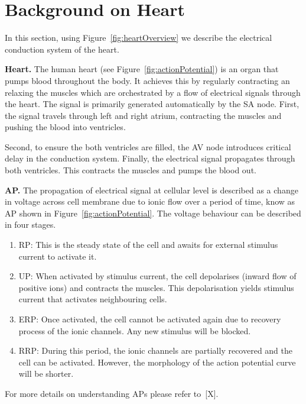 \section{Background on Heart }
\begin{figure*}[htbp]
	\centering
	
	\caption{Electrical conduction systems of a heart}
	\label{fig:heartOverview}
\end{figure*}

In this section, using Figure~\ref{fig:heartOverview} we 
describe the electrical conduction system of the heart.

\noindent \textbf{Heart.}
The human heart (see Figure~\ref{fig:actionPotential})
 is an organ that pumps blood throughout the body.
It achieves this by regularly contracting an relaxing the muscles
which are orchestrated by a flow of electrical signals through the heart.
The signal is primarily generated automatically by the \ac{SA} node.
First, the signal travels through left and right atrium, contracting 
the muscles and pushing the blood into ventricles.
 
Second, to ensure the both ventricles are filled, 
the \ac{AV} node introduces critical delay 
in the conduction system.   
Finally, the electrical signal propagates through 
both ventricles. This contracts the muscles and pumps the blood out.


	
\noindent \textbf{\acf{AP}.} 
The propagation of electrical signal at cellular level 
is described as a change in  voltage 
across cell membrane due to ionic flow over a period of time, 
know as \acf{AP} shown in Figure~\ref{fig:actionPotential}. 
The voltage behaviour can be described in four stages.
\begin{enumerate}
	\item \acf{RP}: This is the steady state of the cell and awaits for 
					external stimulus current to activate it.
	\item \acf{UP}: When activated by stimulus current, 
					the cell depolarises (inward flow of positive ions) and 
					contracts the muscles. This depolarisation yields 
					stimulus current that activates neighbouring cells.
	\item \acf{ERP}: Once activated, the cell cannot be activated again 
					 due to recovery process of the ionic channels. 
					 Any new stimulus will be blocked. 
	\item \acf{RRP}: During this period, the ionic channels are partially recovered
					 and the cell can be activated. However, the morphology
					 of the action potential curve will be shorter.
	
\end{enumerate} 
 For more details on understanding \acp{AP} please refer to~[X].

